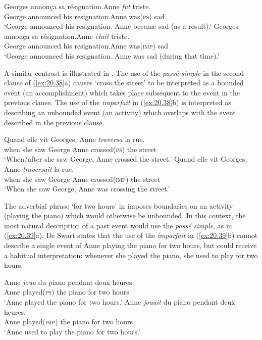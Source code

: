 \ea \label{ex:20.37}
\ea   \gll Georges  annonça  sa  résignation.\quad Anne  \textit{fut}  triste.\\
George  announced  his  resignation.\quad Anne  was(\textsc{ps})  sad\\
\glt ‘George announced his resignation. Anne became sad (as a result).’
\ex \gll  Georges  annonça  sa  résignation.\quad Anne  \textit{était}  triste.\\
George  announced  his  resignation.\quad Anne  was(\textsc{imp})  sad\\
\glt ‘George announced his resignation. Anne was sad (during that time).’
\z \z


A similar contrast is illustrated in . The use of the \textit{passé simple} in the second clause of (\ref{ex:20.38}a) causes ‘cross the street’ to be interpreted as a bounded event (an accomplishment) which takes place subsequent to the event in the previous clause. The use of the \textit{imparfait} in (\ref{ex:20.38}b) is interpreted as describing an unbounded event (an activity) which overlaps with the event described in the previous clause.


\ea \label{ex:20.38}
\ea  \gll Quand  elle  vit  Georges,  Anne  \textit{traversa}  la  rue.\\
when  she  saw  George  Anne  crossed(\textsc{ps})  the  street\\
\glt ‘When/after she saw George, Anne crossed the street.’
\ex \gll  Quand  elle  vit  Georges,  Anne  \textit{traversait}  la  rue.\\
when  she  saw  George  Anne  crossed(\textsc{imp})  the  street\\
\glt ‘When she saw George, Anne was crossing the street.’
\z \z


The adverbial phrase ‘for two hours’ in  imposes boundaries on an activity (playing the piano) which would otherwise be unbounded. In this context, the most natural description of a past event would use the \textit{passé simple}, as in (\ref{ex:20.39}a). De Swart states that the use of the \textit{imparfait} in (\ref{ex:20.39}b) cannot describe a single event of Anne playing the piano for two hours, but could receive a habitual interpretation: whenever she played the piano, she used to play for two hours.


\ea \label{ex:20.39}
\ea  \gll  Anne  \textit{joua}  du  piano  pendant  deux  heures.\\
Anne  played(\textsc{ps})  the  piano  for  two  hours\\
\glt ‘Anne played the piano for two hours.’
\ex \gll  Anne  \textit{jouait}  du  piano  pendant  deux  heures.\\
Anne  played(\textsc{imp})  the  piano  for  two  hours\\
\glt ‘Anne used to play the piano for two hours.’
\z \z



